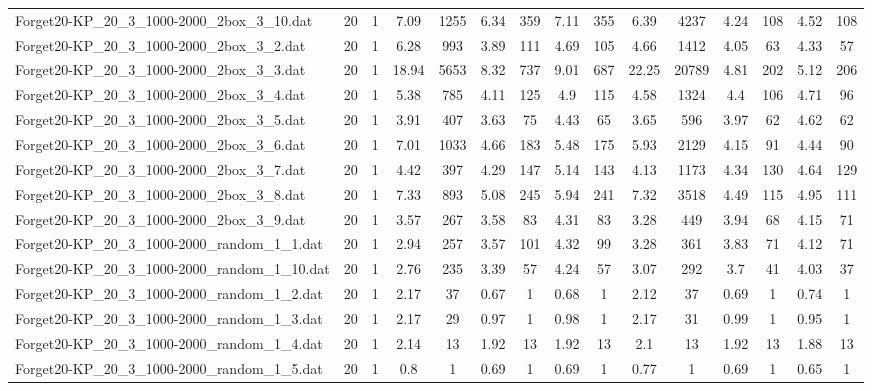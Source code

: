 \begin{table}[!ht]
{\begin{tabular}{lcccccccccccccc}
Forget20-KP\_20\_3\_1000-2000\_2box\_3\_10.dat & 20 & 1 & 7.09 & 1255 & 6.34 & 359 & 7.11 & 355 & 6.39 & 4237 & 4.24 & 108 & 4.52 & 108 \\
Forget20-KP\_20\_3\_1000-2000\_2box\_3\_2.dat & 20 & 1 & 6.28 & 993 & 3.89 & 111 & 4.69 & 105 & 4.66 & 1412 & 4.05 & 63 & 4.33 & 57 \\
Forget20-KP\_20\_3\_1000-2000\_2box\_3\_3.dat & 20 & 1 & 18.94 & 5653 & 8.32 & 737 & 9.01 & 687 & 22.25 & 20789 & 4.81 & 202 & 5.12 & 206 \\
Forget20-KP\_20\_3\_1000-2000\_2box\_3\_4.dat & 20 & 1 & 5.38 & 785 & 4.11 & 125 & 4.9 & 115 & 4.58 & 1324 & 4.4 & 106 & 4.71 & 96 \\
Forget20-KP\_20\_3\_1000-2000\_2box\_3\_5.dat & 20 & 1 & 3.91 & 407 & 3.63 & 75 & 4.43 & 65 & 3.65 & 596 & 3.97 & 62 & 4.62 & 62 \\
Forget20-KP\_20\_3\_1000-2000\_2box\_3\_6.dat & 20 & 1 & 7.01 & 1033 & 4.66 & 183 & 5.48 & 175 & 5.93 & 2129 & 4.15 & 91 & 4.44 & 90 \\
Forget20-KP\_20\_3\_1000-2000\_2box\_3\_7.dat & 20 & 1 & 4.42 & 397 & 4.29 & 147 & 5.14 & 143 & 4.13 & 1173 & 4.34 & 130 & 4.64 & 129 \\
Forget20-KP\_20\_3\_1000-2000\_2box\_3\_8.dat & 20 & 1 & 7.33 & 893 & 5.08 & 245 & 5.94 & 241 & 7.32 & 3518 & 4.49 & 115 & 4.95 & 111 \\
Forget20-KP\_20\_3\_1000-2000\_2box\_3\_9.dat & 20 & 1 & 3.57 & 267 & 3.58 & 83 & 4.31 & 83 & 3.28 & 449 & 3.94 & 68 & 4.15 & 71 \\
Forget20-KP\_20\_3\_1000-2000\_random\_1\_1.dat & 20 & 1 & 2.94 & 257 & 3.57 & 101 & 4.32 & 99 & 3.28 & 361 & 3.83 & 71 & 4.12 & 71 \\
Forget20-KP\_20\_3\_1000-2000\_random\_1\_10.dat & 20 & 1 & 2.76 & 235 & 3.39 & 57 & 4.24 & 57 & 3.07 & 292 & 3.7 & 41 & 4.03 & 37 \\
Forget20-KP\_20\_3\_1000-2000\_random\_1\_2.dat & 20 & 1 & 2.17 & 37 & 0.67 & 1 & 0.68 & 1 & 2.12 & 37 & 0.69 & 1 & 0.74 & 1 \\
Forget20-KP\_20\_3\_1000-2000\_random\_1\_3.dat & 20 & 1 & 2.17 & 29 & 0.97 & 1 & 0.98 & 1 & 2.17 & 31 & 0.99 & 1 & 0.95 & 1 \\
Forget20-KP\_20\_3\_1000-2000\_random\_1\_4.dat & 20 & 1 & 2.14 & 13 & 1.92 & 13 & 1.92 & 13 & 2.1 & 13 & 1.92 & 13 & 1.88 & 13 \\
Forget20-KP\_20\_3\_1000-2000\_random\_1\_5.dat & 20 & 1 & 0.8 & 1 & 0.69 & 1 & 0.69 & 1 & 0.77 & 1 & 0.69 & 1 & 0.65 & 1 \\

\end{tabular}}
\end{table}
